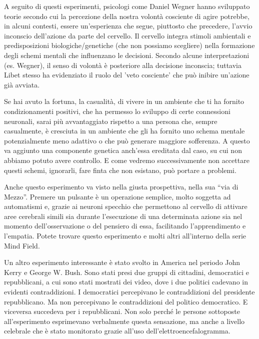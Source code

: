 \documentclass[12pt]{book} %
\begin{document}
A seguito di questi esperimenti, psicologi come Daniel Wegner hanno sviluppato teorie secondo cui la percezione della nostra volontà cosciente di agire potrebbe, in alcuni contesti, essere un'esperienza che segue, piuttosto che precedere, l'avvio inconscio dell'azione da parte del cervello.
Il cervello integra stimoli ambientali e predisposizioni biologiche/genetiche (che non possiamo scegliere) nella formazione degli schemi mentali che influenzano le decisioni. Secondo alcune interpretazioni (es. Wegner), il senso di volontà è posteriore alla decisione inconscia; tuttavia Libet stesso ha evidenziato il ruolo del 'veto cosciente' che può inibire un'azione già avviata.

Se hai avuto la fortuna, la casualità, di vivere in un ambiente che ti ha fornito condizionamenti positivi, che ha
permesso lo sviluppo di certe connessioni neuronali, sarai più avvantaggiato rispetto a una persona che, sempre
casualmente, è cresciuta in un ambiente che gli ha fornito uno schema mentale potenzialmente meno adattivo o che può generare maggiore sofferenza. A questo va aggiunto una componente genetica anch'essa ereditata dal caso, su cui non
abbiamo potuto avere controllo. E come vedremo successivamente non accettare questi schemi, ignorarli, fare finta che
non esistano, può portare a problemi.

Anche questo esperimento va visto nella giusta prospettiva, nella sua “via di Mezzo”. Premere un pulsante è un
operazione semplice, molto soggetta ad automatismi e, grazie ai neuroni specchio che permettono al cervello di attivare aree cerebrali simili sia durante l'esecuzione di una determinata azione sia nel momento dell'osservazione o del pensiero di essa, facilitando l'apprendimento e l'empatia. Potete trovare questo esperimento e
molti altri all'interno della serie Mind
Field.

Un altro esperimento interessante è stato svolto in America nel periodo John Kerry e George W. Bush. Sono stati presi
due gruppi di cittadini, democratici e repubblicani, a cui sono stati mostrati dei video, dove i due politici cadevano
in evidenti contraddizioni. I democratici percepivano le contraddizioni del presidente repubblicano. Ma non percepivano
le contraddizioni del politico democratico. E viceversa succedeva per i repubblicani. Non solo perché le persone
sottoposte all'esperimento esprimevano verbalmente questa sensazione, ma anche a livello celebrale
che è stato monitorato grazie all'uso dell'elettroencefalogramma.
\end{document}
